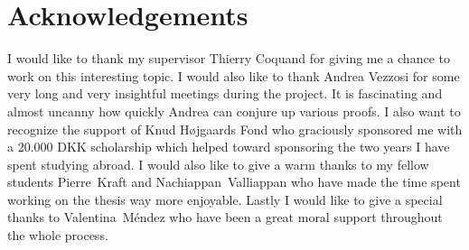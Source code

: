 \chapter*{Acknowledgements}
I would like to thank my supervisor Thierry Coquand for giving me a
chance to work on this interesting topic. I would also like to thank
Andrea Vezzosi for some very long and very insightful meetings during
the project. It is fascinating and almost uncanny how quickly Andrea
can conjure up various proofs.  I also want to recognize the support
of Knud Højgaards Fond who graciously sponsored me with a 20.000 DKK
scholarship which helped toward sponsoring the two years I have spent
studying abroad. I would also like to give a warm thanks to my fellow
students Pierre~Kraft and Nachiappan~Valliappan who have made the time
spent working on the thesis way more enjoyable. Lastly I would like to
give a special thanks to Valentina~Méndez who have been a great moral
support throughout the whole process.
